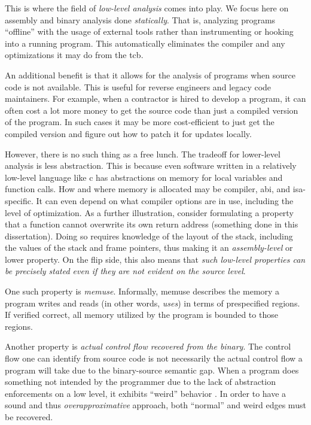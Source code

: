 This is where the field of \emph{low-level analysis} comes into play.
We focus here on assembly and binary analysis done \emph{statically}.
That is, analyzing programs ``offline'' with the usage of external tools rather than instrumenting or hooking into a running program.
This automatically eliminates the compiler and any optimizations it may do from the \ac{tcb}.

An additional benefit is that it allows for the analysis of programs when source code is not available.
This is useful for reverse engineers and legacy code maintainers.
For example, when a contractor is hired to develop a program, it can often cost a lot more money to get the source code than just a compiled version of the program.
In such cases it may be more cost-efficient to just get the compiled version and figure out how to patch it for updates locally.

However, there is no such thing as a free lunch.
The tradeoff for lower-level analysis is less abstraction.
This is because even software written in a relatively low-level language like \gls{c} has abstractions on memory for local variables and function calls.
How and where memory is allocated may be compiler, \ac{abi}, and \ac{isa}-specific.
It can even depend on what compiler options are in use, including the level of optimization.
As a further illustration, consider formulating a property that a function cannot overwrite its own return address (something done in this dissertation).
Doing so requires knowledge of the layout of the stack, including the values of the stack and frame pointers, thus making it an \emph{assembly-level} or lower property.
On the flip side, this also means that \emph{such low-level properties can be precisely stated even if they are not evident on the source level}.

One such property is \emph{\gls{memuse}}.
Informally, \gls{memuse} describes the memory a program writes and reads (in other words, \emph{uses}) in terms of prespecified regions.
If verified correct, all memory utilized by the program is bounded to those regions.

Another property is \emph{actual control flow recovered from the binary}.
The control flow one can identify from source code is not necessarily the actual control flow a program will take due to the binary-source semantic gap.
When a program does something not intended by the programmer due to the lack of abstraction enforcements on a low level, it exhibits ``weird'' behavior \autocite{shapiro2013weird,dullien2017weird}.
In order to have a sound and thus \emph{overapproximative} approach, both ``normal'' and weird edges must be recovered.

